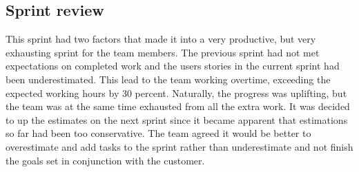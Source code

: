 \subsection{Sprint review}
This sprint had two factors that made it into a very productive, but very exhausting sprint for the team members. The previous sprint had not met expectations on completed work and the users stories in the current sprint had been underestimated. This lead to the team working overtime, exceeding the expected working hours by 30 percent. Naturally, the progress was uplifting, but the team was at the same time exhausted from all the extra work. It was decided to up the estimates on the next sprint since it became apparent that estimations so far had been too conservative. The team agreed it would be better to overestimate and add tasks to the sprint rather than underestimate and not finish the goals set in conjunction with the customer.